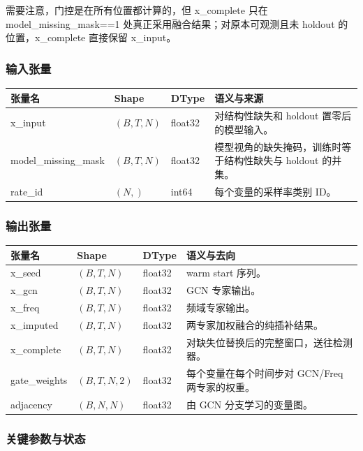 \documentclass[11pt,a4paper]{ctexart}
\newcommand{\code}[1]{{\ttfamily\small #1}}
\begin{document}
需要注意，门控是在所有位置都计算的，但 \code{x\_complete} 只在 \code{model\_missing\_mask==1} 处真正采用融合结果；对原本可观测且未 holdout 的位置，\code{x\_complete} 直接保留 \code{x\_input}。

\subsubsection{输入张量}

\begin{tabularx}{\textwidth}{@{}L{3.8cm}L{2.3cm}L{1.5cm}Y@{}}
\toprule
张量名 & Shape & DType & 语义与来源 \\
\midrule
\code{x\_input} & $(B,T,N)$ & \code{float32} & 对结构性缺失和 holdout 置零后的模型输入。 \\
\code{model\_missing\_mask} & $(B,T,N)$ & \code{float32} & 模型视角的缺失掩码，训练时等于结构性缺失与 holdout 的并集。 \\
\code{rate\_id} & $(N,)$ & \code{int64} & 每个变量的采样率类别 ID。 \\
\bottomrule
\end{tabularx}

\subsubsection{输出张量}

\begin{tabularx}{\textwidth}{@{}L{3.8cm}L{2.3cm}L{1.5cm}Y@{}}
\toprule
张量名 & Shape & DType & 语义与去向 \\
\midrule
\code{x\_seed} & $(B,T,N)$ & \code{float32} & warm start 序列。 \\
\code{x\_gcn} & $(B,T,N)$ & \code{float32} & GCN 专家输出。 \\
\code{x\_freq} & $(B,T,N)$ & \code{float32} & 频域专家输出。 \\
\code{x\_imputed} & $(B,T,N)$ & \code{float32} & 两专家加权融合的纯插补结果。 \\
\code{x\_complete} & $(B,T,N)$ & \code{float32} & 对缺失位替换后的完整窗口，送往检测器。 \\
\code{gate\_weights} & $(B,T,N,2)$ & \code{float32} & 每个变量在每个时间步对 GCN/Freq 两专家的权重。 \\
\code{adjacency} & $(B,N,N)$ & \code{float32} & 由 GCN 分支学习的变量图。 \\
\bottomrule
\end{tabularx}

\subsubsection{关键参数与状态}
\end{document}
